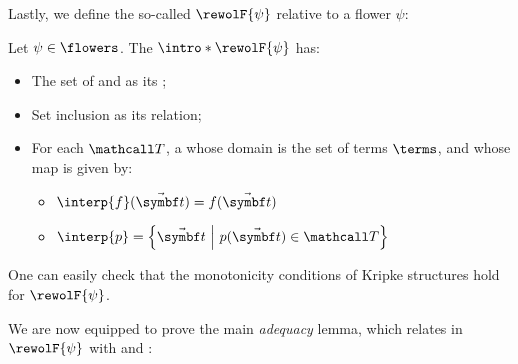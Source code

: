 \begin{scope}
Lastly, we define the so-called \emph{}
$\rewolF{\psi}$ relative to a flower $\psi$:

\begin{definition}
  \AP Let $\psi \in \flowers$. The 
  $\intro*\rewolF{\psi}$ has:
  \begin{itemize}
    \item The set of \consistent{\psi} and \complete{\psi}  as its ;
    \item Set inclusion as its  relation;
    \item For each  $\tT$, a  whose domain is the set of
    terms $\terms$, and whose  map is given by:
      \begin{itemize}
        \item $\interp{f}(\tvec{t}) = f(\tvec{t})$
        \item $\interp{p} = \compr{\tvec{t}}{p(\tvec{t}) \in \tT}$
      \end{itemize}
  \end{itemize}
  One can easily check that the monotonicity conditions of Kripke structures
  hold for $\rewolF{\psi}$.
\end{definition}

We are now equipped to prove the main \emph{adequacy} lemma, which relates
 in $\rewolF{\psi}$ with \consistency{\psi} and \completeness{\psi}:

\begin{lemma}[Adequacy]


\end{lemma}
\end{scope}
